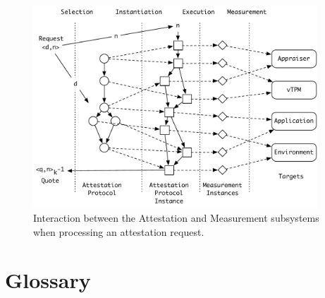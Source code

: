 \documentclass[10pt]{article}
\begin{document}
\begin{figure}
\centering 
\includegraphics[width=0.950\textwidth]{figures/ap-1.pdf}
\caption{Interaction between the Attestation and Measurement
  subsystems when processing an attestation request.}
\label{fig:ap-1}
\end{figure}


\appendix

\section{Glossary}
\end{document}

